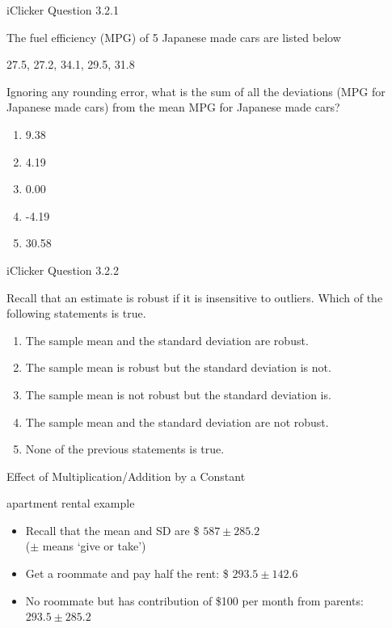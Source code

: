 \documentclass[14pt]{beamer}\usepackage[]{graphicx}\usepackage[]{color}
\begin{document}
\begin{frame}[fragile]{iClicker Question 3.2.1}

The fuel efficiency (MPG) of 5 Japanese made cars are listed below

27.5,	27.2,	34.1,	29.5,	31.8

Ignoring any rounding error, what is the sum of all the deviations (MPG  for Japanese made cars) from the mean MPG for Japanese made  cars?

\begin{enumerate}
\item 9.38
\item 4.19
\item 0.00
\item -4.19
\item 30.58
\end{enumerate}
\end{frame}

\begin{frame}[fragile]{iClicker Question 3.2.2}

Recall that an estimate is robust if it is insensitive to outliers. Which of  the following statements is true.

\begin{enumerate}
\item The sample mean and the standard deviation are robust.
\item The sample mean is robust but the standard deviation is  not.
\item The sample mean is not robust but the standard deviation  is.
\item The sample mean and the standard deviation are not  robust.
\item None of the previous statements is true.
\end{enumerate}
\end{frame}

\begin{frame}[fragile]{Effect of Multiplication/Addition by a Constant}



\begin{center}
apartment rental example
\end{center}

\begin{itemize}
\item<1-> Recall that the mean and SD are \$ $587 \pm 285.2$ \\ ($\pm$ means `give or take')
\item<2-> Get a roommate and pay half the rent: \$ $293.5 \pm 142.6$ %
\item<3-> No roommate but has contribution of \$100 per month from parents: $293.5 \pm 285.2$    %
\end{itemize}
\end{frame}
\end{document}
